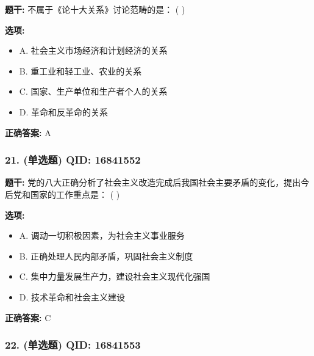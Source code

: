 \documentclass[12pt,UTF8]{ctexart}
\begin{document}
\textbf{题干:}
不属于《论十大关系》讨论范畴的是： ( )

\textbf{选项:}
\begin{itemize}[leftmargin=*]

  \item A. 社会主义市场经济和计划经济的关系

  \item B. 重工业和轻工业、农业的关系

  \item C. 国家、生产单位和生产者个人的关系

  \item D. 革命和反革命的关系

\end{itemize}

\textbf{正确答案:}
A

\vspace{0.3em}\hrulefill\vspace{0.7em}

\subsubsection*{21. (单选题) \small QID: 16841552}

\textbf{题干:}
党的八大正确分析了社会主义改造完成后我国社会主要矛盾的变化，提出今后党和国家的工作重点是： ( )

\textbf{选项:}
\begin{itemize}[leftmargin=*]

  \item A. 调动一切积极因素，为社会主义事业服务

  \item B. 正确处理人民内部矛盾，巩固社会主义制度

  \item C. 集中力量发展生产力，建设社会主义现代化强国

  \item D. 技术革命和社会主义建设

\end{itemize}

\textbf{正确答案:}
C

\vspace{0.3em}\hrulefill\vspace{0.7em}

\subsubsection*{22. (单选题) \small QID: 16841553}
\end{document}

